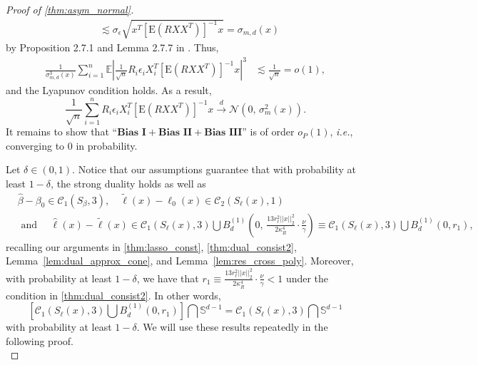 \documentclass[ejsv2,noshowframe]{imsart}
\theoremstyle{plain}
\theoremstyle{definition}
\theoremstyle{remark}
\newcommand{\norm}[1]{\left|\left| #1 \right|\right|}
\renewcommand{\hat}{\widehat}
\renewcommand{\tilde}{\widetilde}
\begin{document}
\begin{proof}[Proof of \autoref{thm:asym_normal}]
\begin{align*}
		&\lesssim \sigma_{\epsilon} \sqrt{x^T\left[\mathrm{E}(R XX^T)\right]^{-1}x} = \sigma_{m,d}(x)
	\end{align*}
	by Proposition 2.7.1 and Lemma 2.7.7 in \cite{vershynin2018high}. Thus, 
	\begin{align*}
		\frac{1}{\sigma_{m,d}^3(x)}\sum_{i=1}^n \mathbb{E}\left|\frac{1}{\sqrt{n}}  R_i\epsilon_i X_i^T \left[\mathrm{E}\left(R XX^T\right)\right]^{-1} x\right|^3 &\lesssim \frac{1}{\sqrt{n}} = o(1), 
	\end{align*}
	and the Lyapunov condition holds. As a result,
	$$\frac{1}{\sqrt{n}} \sum_{i=1}^n R_i\epsilon_i X_i^T\left[\mathrm{E}\left(R XX^T\right)\right]^{-1} x \stackrel{d}{\to} \mathcal{N}\left(0,\, \sigma_m^2(x) \right).$$
	It remains to show that ``$\textbf{Bias I} + \textbf{Bias II} + \textbf{Bias III}$'' is of order $o_P(1)$, \emph{i.e.}, converging to 0 in probability.
	
	Let $\delta \in (0,1)$. Notice that our assumptions guarantee that with probability at least $1-\delta$, the strong duality holds as well as 
	\begin{align*}
		&\hat{\beta}-\beta_0 \in \mathcal{C}_1(S_{\beta}, 3), \quad \tilde{\ell}(x) - \ell_0(x) \in \mathcal{C}_2(S_{\ell}(x),1)\\ 
		&\text{ and } \quad \hat{\ell}(x) - \tilde{\ell}(x) \in \mathcal{C}_1(S_{\ell}(x),3) \bigcup B_d^{(1)}\left(0,\, \frac{13 r_{\ell}^2 \norm{x}_2^2}{2 \kappa_R^4} \cdot \frac{\nu}{\gamma}\right) \equiv \mathcal{C}_1\left(S_{\ell}(x),3\right) \bigcup B_d^{(1)}(0,r_1), 
	\end{align*}
	recalling our arguments in \autoref{thm:lasso_const}, \autoref{thm:dual_consist2}, Lemma~\ref{lem:dual_approx_cone}, and Lemma~\ref{lem:res_cross_poly}. Moreover, with probability at least $1-\delta$, we have that $r_1\equiv \frac{13 r_{\ell}^2 \norm{x}_2^2}{2 \kappa_R^4} \cdot \frac{\nu}{\gamma} < 1$ under the condition in \autoref{thm:dual_consist2}. In other words, 
	$$\left[\mathcal{C}_1\left(S_{\ell}(x), 3 \right) \bigcup B_d^{(1)}(0,r_1)\right] \bigcap \mathbb{S}^{d-1} = \mathcal{C}_1\left(S_{\ell}(x), 3 \right) \bigcap \mathbb{S}^{d-1}$$
	with probability at least $1-\delta$. 
	We will use these results repeatedly in the following proof.\\
	

\end{proof}
\end{document}
